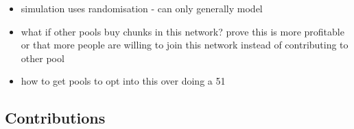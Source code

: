 \begin{itemize}
  \item simulation uses randomisation - can only generally model
  \item what if other pools buy chunks in this network? prove this is more profitable or that more people are willing to join this network instead of contributing to other pool
  \item how to get pools to opt into this over doing a 51%
\end{itemize}

\subsection{Contributions}


